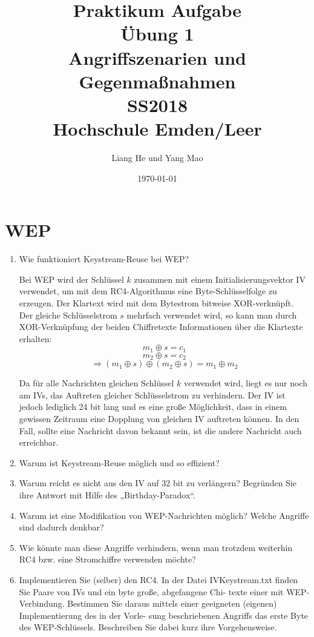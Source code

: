 \documentclass[12pt,a4paper]{article}
\title{	
\textbf{Praktikum Aufgabe\\
		Übung 1\\}
	    Angriffszenarien und\\ Gegenmaßnahmen \\
		SS2018\\
		Hochschule Emden/Leer}
\author{Liang He und Yang Mao}
\date{\today}
\newenvironment{exercise}
	{\begin{enumerate}[label=\bfseries\alph*).]\bfseries}
{\end{enumerate}}
\newenvironment{answer}{\par\normalfont}{}
\begin{document}
    \maketitle
    \newpage
    
    \tableofcontents
    \newpage
    \section{WEP}
    	\begin{exercise}
		\item Wie funktioniert Keystream-Reuse bei WEP?
			\begin{answer}
			Bei WEP wird der Schlüssel $k$ zusammen mit einem Initialisierungsvektor IV verwendet, um mit dem RC4-Algorithmus eine Byte-Schlüsselfolge zu erzeugen. Der Klartext wird mit dem Bytestrom bitweise XOR-verknüpft.\\
			Der gleiche Schlüsselstrom $s$ mehrfach verwendet wird, so kann man durch XOR-Verknüpfung der beiden Chiffretexte Informationen über die Klartexte erhalten:
			\[m_1 \oplus s = c_1\]
			\[m_2 \oplus s = c_2\]
			\[\Rightarrow (m_1 \oplus s)\oplus(m_2\oplus s)=m_1\oplus m_2\]
			
			Da für alle Nachrichten gleichen Schlüssel $k$ verwendet wird, liegt es nur noch am IVs, das Auftreten gleicher Schlüsselstrom zu verhindern. Der IV ist jedoch lediglich 24 bit lang und es eine große Möglichkeit, dass in einem gewissen Zeitraum eine Dopplung von gleichen IV auftreten können. In den Fall, sollte eine Nachricht davon bekannt sein, ist die andere Nachricht auch erreichbar.
			\end{answer}
		\item  Warum ist Keystream-Reuse möglich und so effizient?
		\begin{answer}
			
		\end{answer}
		\item Warum reicht es nicht aus den IV auf 32 bit zu verlängern? Begründen Sie ihre Antwort mit
		Hilfe des „Birthday-Paradox“.
		\item  Warum ist eine Modifikation von WEP-Nachrichten möglich? Welche Angriffe sind dadurch	denkbar?
		\item  Wie könnte man diese Angriffe verhindern, wenn man trotzdem weiterhin RC4 bzw. eine
		Stromchiffre verwenden möchte?
		\item Implementieren Sie (selber) den RC4.
		In der Datei IVKeystream.txt finden Sie Paare von IVs und ein byte große, abgefangene Chi-
		texte einer mit WEP-Verbindung.
		Bestimmen Sie daraus mittels einer geeigneten (eigenen) Implementierung des in der Vorle-
		sung beschriebenen Angriffs das erste Byte des WEP-Schlüssels. Beschreiben Sie dabei kurz
		ihre Vorgehensweise.
    	\end{exercise}
    
\end{document}
